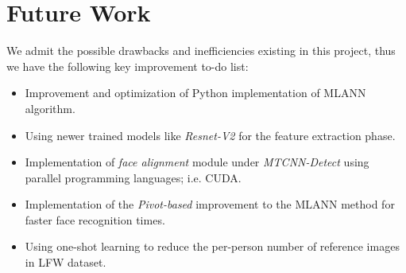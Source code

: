 \chapter{Future Work}
We admit the possible drawbacks and inefficiencies existing in this project, thus we have the following key improvement to-do list:
\begin{itemize}
	\item Improvement and optimization of Python implementation of MLANN algorithm.
	\item Using newer trained models like \textit{Resnet-V2} for the feature extraction phase.
	\item Implementation of \textit{face alignment} module under \textit{MTCNN-Detect} using parallel programming languages; i.e. CUDA.
	\item Implementation of the \textit{Pivot-based} improvement to the MLANN method for faster face recognition times.
	\item Using one-shot learning to reduce the per-person number of reference images in LFW dataset.
\end{itemize}